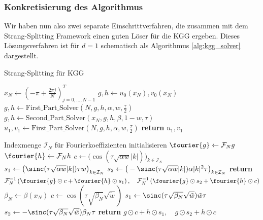 \subsubsection*{Konkretisierung des Algorithmus}
Wir haben nun also zwei separate Einschrittverfahren, die zusammen mit dem Strang-Splitting Framework einen guten Löser für die KGG ergeben. Dieses Lösungsverfahren ist für $d=1$ schematisch als Algorithmus \ref{alg:kgg_solver} dargestellt.
\begin{algorithm}[ht]
    \caption{Strang-Splitting für KGG}
    \label{alg:kgg_solver}
    \begin{algorithmic}[1] %
            \State $x_N\gets (-\pi+\frac{2\pi j}{N})_{j=0,\dots,N-1}^T$
            \State $g,h\gets u_0(x_N), v_0(x_N)$
            \State $g,h\gets \text{First\_Part\_Solver}(N, g, h, \alpha, w, \frac{\tau}{2})$
            \State $g,h\gets \text{Second\_Part\_Solver}(x_N, g, h, \beta, 1-w, \tau)$
            \State $u_1,v_1\gets \text{First\_Part\_Solver}(N, g, h, \alpha, w, \frac{\tau}{2})$
            \State \textbf{return} $u_1, v_1$
        \EndFunction
        
        	\State Indexmenge $\mathcal{I}_N$ für Fourierkoeffizienten initialisieren
        	\State $\fourier{g}\gets \mathcal{F}_Ng$
        	\State $\fourier{h}\gets \mathcal{F}_Nh$
        	\State $c\gets \big(\cos(\tau\sqrt{\alpha w}|k|)\big)_{k\in\mathcal{I}_N}$
        	\State $s_1\gets \big(\sinc(\tau\sqrt{\alpha w}|k|)\tau w\big)_{k\in\mathcal{I}_N}$
        	\State $s_2\gets \big(-\sinc(\tau\sqrt{\alpha w}|k|)\alpha|k|^2\tau\big)_{k\in\mathcal{I}_N}$
            \State \textbf{return} $\mathcal{F}_N^{-1}\left(\fourier{g}\odot c+\fourier{h}\odot s_1\right),\quad \mathcal{F}_N^{-1}\left(\fourier{g}\odot s_2+\fourier{h}\odot c\right)$
        \EndFunction
        	\State $\beta_N\gets\beta(x_N)$
        	\State $c\gets \cos(\tau\sqrt{\beta_N}\sqrt{\tilde{w}})$
        	\State $s_1\gets \sinc(\tau\sqrt{\beta_N}\sqrt{\tilde{w}})\tilde{w}\tau$
        	\State $s_2\gets -\sinc(\tau\sqrt{\beta_N}\sqrt{\tilde{w}})\beta_N\tau$
        	\State \textbf{return} $g\odot c+h\odot s_1,\quad g\odot s_2+h\odot c$
        \EndFunction
    \end{algorithmic}
\end{algorithm}

